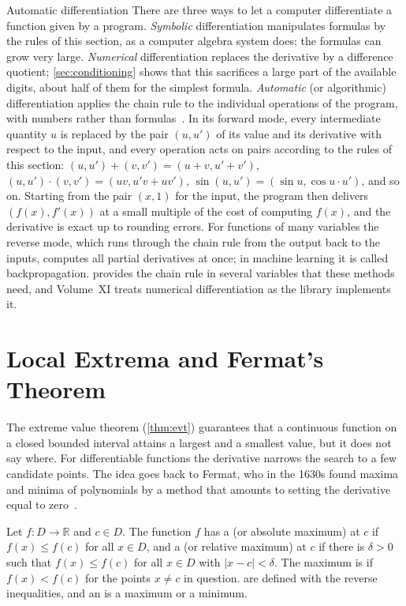 \begin{note}{Automatic differentiation}
There are three ways to let a computer differentiate a function given by a program. \emph{Symbolic} differentiation manipulates formulas by the rules of this section, as a computer algebra system does; the formulas can grow very large. \emph{Numerical} differentiation replaces the derivative by a difference quotient; \cref{sec:conditioning} shows that this sacrifices a large part of the available digits, about half of them for the simplest formula. \emph{Automatic} (or algorithmic) differentiation applies the chain rule to the individual operations of the program, with numbers rather than formulas~\cite{wengert1964,griewank2008}. In its forward mode, every intermediate quantity $u$ is replaced by the pair $(u,u')$ of its value and its derivative with respect to the input, and every operation acts on pairs according to the rules of this section: $(u,u')+(v,v')=(u+v,u'+v')$, $(u,u')\cdot(v,v')=(uv,u'v+uv')$, $\sin(u,u')=(\sin u,\cos u\cdot u')$, and so on. Starting from the pair $(x,1)$ for the input, the program then delivers $(f(x),f'(x))$ at a small multiple of the cost of computing $f(x)$, and the derivative is exact up to rounding errors. For functions of many variables the reverse mode, which runs through the chain rule from the output back to the inputs, computes all partial derivatives at once; in machine learning it is called backpropagation.  provides the chain rule in several variables that these methods need, and Volume~XI treats numerical differentiation as the library implements it.
\end{note}

\section{Local Extrema and Fermat's Theorem}
\label{sec:extrema}

The extreme value theorem (\cref{thm:evt}) guarantees that a continuous function on a closed bounded interval attains a largest and a smallest value, but it does not say where. For differentiable functions the derivative narrows the search to a few candidate points. The idea goes back to Fermat, who in the 1630s found maxima and minima of polynomials by a method that amounts to setting the derivative equal to zero~\cite{edwards1979}.

\begin{definition}[Extrema]
\label{def:extremum}
Let $f\colon D\to\mathbb R$ and $c\in D$. The function $f$ has a  (or absolute maximum) at $c$ if $f(x)\le f(c)$ for all $x\in D$, and a  (or relative maximum) at $c$ if there is $\delta>0$ such that $f(x)\le f(c)$ for all $x\in D$ with $|x-c|<\delta$. The maximum is  if $f(x)<f(c)$ for the points $x\ne c$ in question.  are defined with the reverse inequalities, and an  is a maximum or a minimum.
\end{definition}

